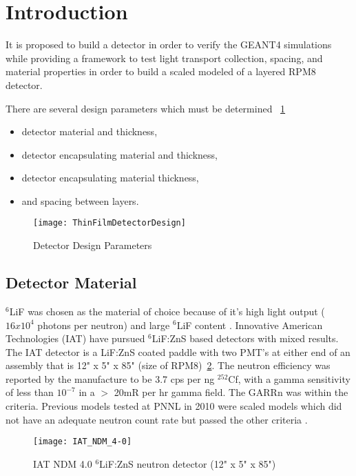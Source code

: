 \section{Introduction}
It is proposed to build a detector in order to verify the GEANT4 simulations while providing a framework to test light transport collection, spacing, and material properties in order to build a scaled modeled of a layered RPM8 detector.

There are several design parameters which must be determined ~\ref{fig:DetectorParameterSchematic}
\begin{itemize}
    \item detector material and thickness,
    \item detector encapsulating material and thickness,
    \item detector encapsulating material thickness,
    \item and spacing between layers.
\end{itemize}
\begin{figure}
    \centering
    \texttt{[image: ThinFilmDetectorDesign]}
    \caption{Detector Design Parameters}
    \label{fig:DetectorParameterSchematic}
\end{figure}

\subsection{Detector Material}
${}^6$LiF was chosen as the material of choice because of it's high light output ($16x10^4$ photons per neutron) and large ${}^{6}$LiF content \cite{carel_w.e_inorganic-scintillator_2001}. 
Innovative American Technologies (IAT) have pursued ${}^6$LiF:ZnS based detectors with mixed results.
The IAT detector is a LiF:ZnS coated paddle with two PMT's at either end of an assembly that is 12" x 5" x 85" (size of RPM8)~\ref{fig:IATPaddle}.
The neutron efficiency was reported by the manufacture to be 3.7 cps per ng ${}^{252}$Cf, with a gamma sensitivity of less than $10^{-7}$ in a $>$ 20mR per hr gamma field.  The GARRn was within the criteria.
Previous models tested at PNNL in 2010 were scaled models which did not have an adequate neutron count rate but passed the other criteria \cite{kouzes_lithium_2010}.
\begin{figure}
    \centering
    \texttt{[image: IAT\_NDM\_4-0]}
    \caption{IAT NDM 4.0 ${}^6$LiF:ZnS neutron detector (12" x 5" x 85")}
    \label{fig:IATPaddle}
\end{figure}

